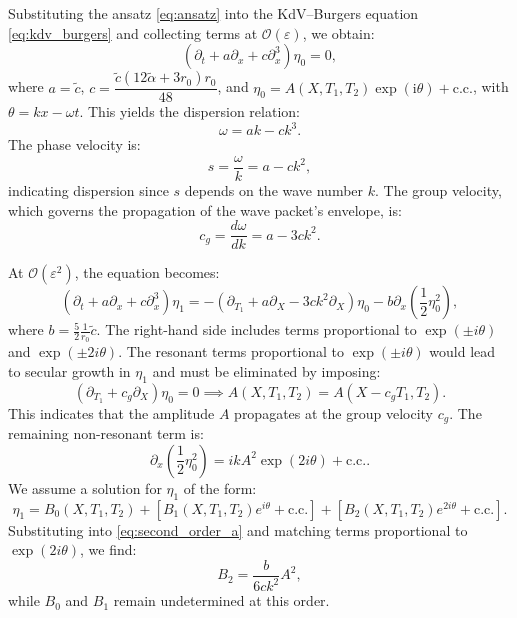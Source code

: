 \documentclass[alpha-refs, 12pt]{wiley-article}
\renewcommand{\O}{\mathcal{O}}
\newcommand{\ui}{\mathrm{i}}
\newcommand{\eps}{\varepsilon}
\begin{document}
Substituting the ansatz \eqref{eq:ansatz} into the KdV--Burgers equation \eqref{eq:kdv_burgers} and collecting terms at $\O(\eps)$, we obtain:
\begin{equation}
\label{eq:leading_order}
\left( \partial_t + a \partial_x + c \partial_x^3 \right) \eta_0 = 0,
\end{equation}
where $a = \tilde{c}$, $c = \dfrac{\tilde{c} (12 \tilde{\alpha} + 3 r_0) r_0}{48}$, and $\eta_0 = A(X, T_1, T_2) \exp(\ui \theta) + \text{c.c.}$, with $\theta = k x - \omega t$. This yields the dispersion relation:
\begin{equation}
\label{eq:dispersion}
\omega = a k - c k^3.
\end{equation}
The phase velocity is:
\[
s = \frac{\omega}{k} = a - c k^2,
\]
indicating dispersion since $s$ depends on the wave number $k$. The group velocity, which governs the propagation of the wave packet's envelope, is:
\[
c_g = \frac{d \omega}{d k} = a - 3 c k^2.
\]

At $\O(\eps^2)$, the equation becomes:
\begin{equation}\label{eq:second_order_a}
  \left( \partial_t + a \partial_x + c \partial_x^3 \right) \eta_1 = - \left( \partial_{T_1} + a \partial_X - 3 c k^2 \partial_X \right) \eta_0 - b \partial_x \left( \frac{1}{2} \eta_0^2 \right),
\end{equation}
where $b = \frac{5}{2} \frac{1}{r_0} \tilde{c}$. The right-hand side includes terms proportional to $\exp(\pm i \theta)$ and $\exp(\pm 2 i \theta)$. The resonant terms proportional to $\exp(\pm i \theta)$ would lead to secular growth in $\eta_1$ and must be eliminated by imposing:
\begin{equation}\label{eq:secular_elimination}
  \left( \partial_{T_1} + c_g \partial_X \right) \eta_0 = 0 \implies A(X, T_1, T_2) = A(X - c_g T_1, T_2).
\end{equation}
This indicates that the amplitude $A$ propagates at the group velocity $c_g$. The remaining non-resonant term is:
\[
  \partial_x \left( \frac{1}{2} \eta_0^2 \right) = i k A^2 \exp(2 i \theta) + \text{c.c.}.
\]
We assume a solution for $\eta_1$ of the form:
\begin{equation}\label{eq:eta1_form}
  \eta_1 = B_0(X, T_1, T_2) + \left[ B_1(X, T_1, T_2) e^{i \theta} + \text{c.c.} \right] + \left[ B_2(X, T_1, T_2) e^{2 i \theta} + \text{c.c.} \right].
\end{equation}
Substituting into \eqref{eq:second_order_a} and matching terms proportional to $\exp(2 i \theta)$, we find:
\begin{equation}\label{eq:B2_solution}
  B_2 = \frac{b}{6 c k^2} A^2,
\end{equation}
while $B_0$ and $B_1$ remain undetermined at this order.
\end{document}
